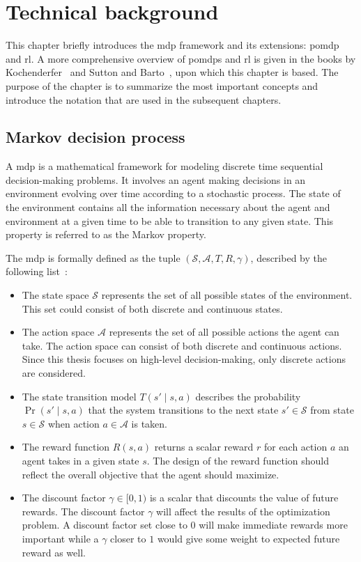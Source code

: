\chapter{Technical background}\label{ch:background}
This chapter briefly introduces the \gls{mdp} framework and its extensions: \gls{pomdp} and \gls{rl}. A more comprehensive overview of \gls{pomdp}s and \gls{rl} is given in the books by Kochenderfer~\cite{Kochenderfer2015} and Sutton and Barto~\cite{Sutton2018}, upon which this chapter is based. The purpose of the chapter is to summarize the most important concepts and introduce the notation that are used in the subsequent chapters. 

\section{Markov decision process}\label{sec:background_mdp}
A \gls{mdp} is a mathematical framework for modeling discrete time sequential decision-making problems. It involves an agent making decisions in an environment evolving over time according to a stochastic process. The state of the environment contains all the information necessary about the agent and environment at a given time to be able to transition to any given state. This property is referred to as the Markov property. 

The \gls{mdp} is formally defined as the tuple $( \mathcal{S}, \mathcal{A}, T, R, \gamma )$, described by the following list~\cite{Kochenderfer2015}:
\begin{itemize}
    \item The state space $\mathcal{S}$ represents the set of all possible states of the environment. This set could consist of both discrete and continuous states.
    \item The action space $\mathcal{A}$ represents the set of all possible actions the agent can take. The action space can  consist of both discrete and continuous actions. Since this thesis focuses on high-level decision-making, only discrete actions are considered.
    \item The state transition model $T(s' \mid s,a)$ describes the probability $\Pr(s' \mid s,a)$ that the system transitions to the next state $s' \in \mathcal{S}$ from state $s \in \mathcal{S}$ when action $a \in \mathcal{A}$ is taken.
    \item The reward function $R(s,a)$ returns a scalar reward $r$ for each action $a$ an agent takes in a given state $s$. The design of the reward function should reflect the overall objective that the agent should maximize.
    \item The discount factor $\gamma \in [0,1)$ is a scalar that discounts the value of future rewards. The discount factor $\gamma$ will affect the results of the optimization problem. A discount factor set close to $0$ will make immediate rewards more important while a $\gamma$ closer to $1$ would give some weight to expected future reward as well. 
\end{itemize}

